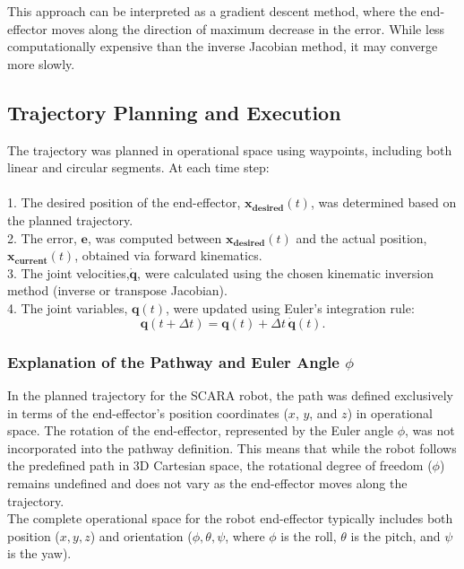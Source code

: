 \documentclass[12pt]{report}
\begin{document}
		This approach can be interpreted as a gradient descent method, where the end-effector moves along the direction of maximum decrease in the error. While less computationally expensive than the inverse Jacobian method, it may converge more slowly.
		
		\subsection{Trajectory Planning and Execution}
		
		The trajectory was planned in operational space using waypoints, including both linear and circular segments. At each time step:\\\\
		1. The desired position of the end-effector, \(\mathbf{x_\text{desired}}(t)\), was determined based on the planned trajectory.\\
		2. The error, \(\mathbf{e}\), was computed between \(\mathbf{x_\text{desired}}(t)\) and the actual position, \(\mathbf{x_\text{current}}(t)\), obtained via forward kinematics.\\
		3. The joint velocities,\(\dot{\mathbf{q}}\), were calculated using the chosen kinematic inversion method (inverse or transpose Jacobian).\\
		4. The joint variables, \(\mathbf{q}(t)\), were updated using Euler's integration rule:\\
		\begin{equation}
			\mathbf{q}(t + \Delta t) = \mathbf{q}(t) + \Delta t \, \dot{\mathbf{q}}(t).
		\end{equation}
		
		
	
		\subsubsection{Explanation of the Pathway and Euler Angle \(\phi\)}
		
		In the planned trajectory for the SCARA robot, the path was defined exclusively in terms of the end-effector's position coordinates (\(x\), \(y\), and \(z\)) in operational space. The rotation of the end-effector, represented by the Euler angle \(\phi\), was not incorporated into the pathway definition. This means that while the robot follows the predefined path in 3D Cartesian space, the rotational degree of freedom (\(\phi\)) remains undefined and does not vary as the end-effector moves along the trajectory.\\The complete operational space for the robot end-effector typically includes both position (\(x, y, z\)) and orientation (\(\phi, \theta, \psi\), where \(\phi\) is the roll, \(\theta\) is the pitch, and \(\psi\) is the yaw).
		
\end{document}
